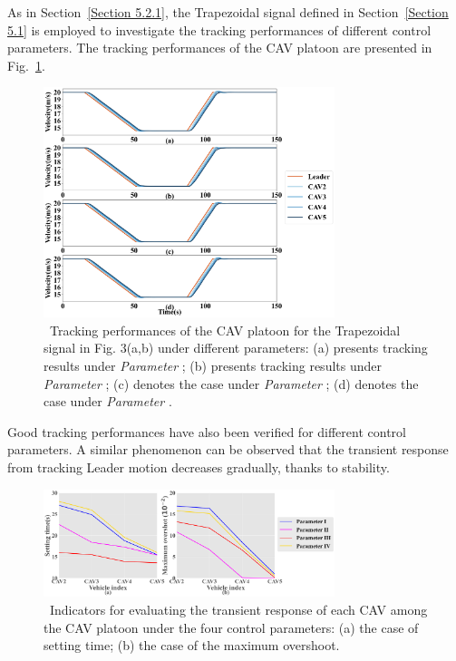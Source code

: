 \documentclass[journal]{IEEEtran}
\begin{document}
As in Section~\ref{Section 5.2.1}, the Trapezoidal signal defined in Section~\ref{Section 5.1} is employed to investigate the tracking performances of different control parameters. The tracking performances of the CAV platoon are presented in Fig.~\ref{fig9}.

\begin{figure}
  \centering
  \includegraphics[width=8.5cm]{figs/fig9.png}
  \caption{~Tracking performances of the CAV platoon for the Trapezoidal signal in Fig. 3(a,b) under different parameters: (a) presents tracking results under \textit{Parameter \uppercase\expandafter{}}; (b) presents tracking results under \textit{Parameter \uppercase\expandafter{}}; (c) denotes the case under \textit{Parameter \uppercase\expandafter{}}; (d) denotes the case under \textit{Parameter \uppercase\expandafter{}}.}
  \label{fig9}
\end{figure}

Good tracking performances have also been verified for different control parameters. A similar phenomenon can be observed that the transient response from tracking Leader motion decreases gradually, thanks to stability.

\begin{figure}
  \centering
  \includegraphics[width=8.5cm]{figs/fig10.png}
  \caption{~Indicators for evaluating the transient response of each CAV among the CAV platoon under the four control parameters: (a) the case of setting time; (b) the case of the maximum overshoot.}
  \label{fig10}
\end{figure}
\end{document}
